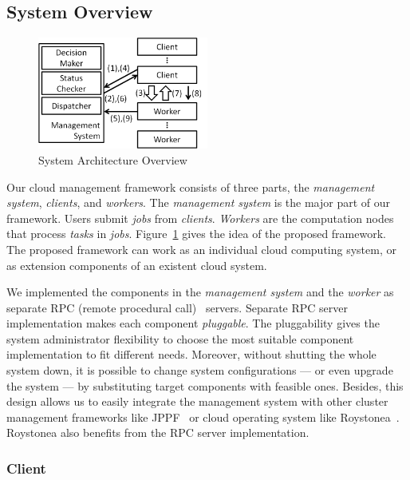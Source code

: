 \subsection{System Overview}	%

\begin{figure}[htbp]
\centering
\includegraphics[width = 0.5\textwidth, bb=0 0 490 350]{./figures/flow.png}
\caption{System Architecture Overview}
\label{fig:archi-overview}
\end{figure}

Our cloud management framework consists of three parts, the \emph{
management system}, \emph{clients}, and \emph{workers}.  
The \emph{management system} is the major part of our framework.  
Users submit \emph{jobs} from \emph{clients}.
\emph{Workers} are the computation nodes that process \emph{tasks} in 
\emph{jobs}.
Figure~\ref{fig:archi-overview} gives the idea of the proposed 
framework.
The proposed framework can work as an individual cloud computing 
system, or as extension components of an existent cloud system.

We implemented the components in the \emph{management system} and the 
\emph{worker} as separate RPC (remote procedural call)~\cite{cite:RPC} 
servers.
Separate RPC server implementation makes each component \emph{pluggable}.
The pluggability gives the system administrator flexibility to choose
the most suitable component implementation to fit different needs.
Moreover, without shutting the whole system down, it is possible to
change system configurations --- or even upgrade the system --- by
substituting target components with feasible ones.
Besides, this design allows us to easily integrate the management system
with other cluster management frameworks like JPPF~\cite{cite:JPPF} or
cloud operating system like Roystonea~\cite{cite:roystonea}.
Roystonea also benefits from the RPC server implementation.


\subsubsection{Client}	%

